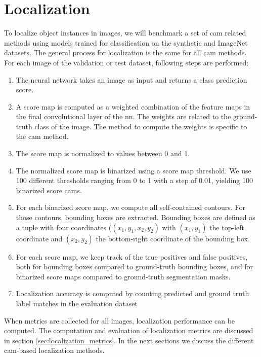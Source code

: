 \section{Localization} \label{lb:wsol_methods}
To localize object instances in images, we will benchmark a set of \acrshort{cam} related methods using models trained for classification on the synthetic and ImageNet datasets. The general process for localization is the same for all \acrshort{cam} methods. For each image of the validation or test dataset, following steps are performed:
\begin{enumerate}
    \item The neural network takes an image as input and returns a class prediction score.
    \item A score map is computed as a weighted combination of the feature maps in the final convolutional layer of the \acrshort{nn}. The weights are related to the ground-truth class of the image. The method to compute the weights is specific to the \acrshort{cam} method.
    \item The score map is normalized to values between 0 and 1.
    \item The normalized score map is binarized using a score map threshold. We use 100 different thresholds ranging from 0 to 1 with a step of 0.01, yielding 100 binarized score cams.
    \item For each binarized score map, we compute all self-contained contours. For those contours, bounding boxes are extracted. Bounding boxes are defined as a tuple with four coordinates ($(x_1, y_1, x_2, y_2)$ with $(x_1, y_1)$ the top-left coordinate and $(x_2, y_2)$ the bottom-right coordinate of the bounding box.
    \item For each score map, we keep track of the true positives and false positives, both for bounding boxes compared to ground-truth bounding boxes, and for binarized score maps compared to ground-truth segmentation masks.
    \item Localization accuracy is computed by counting predicted and ground truth label matches in the evaluation dataset
\end{enumerate}
When metrics are collected for all images, localization performance can be computed. The computation and evaluation of localization metrics are discussed in section \ref{sec:localization_metrics}. In the next sections we discuss the different \acrshort{cam}-based localization methods.

